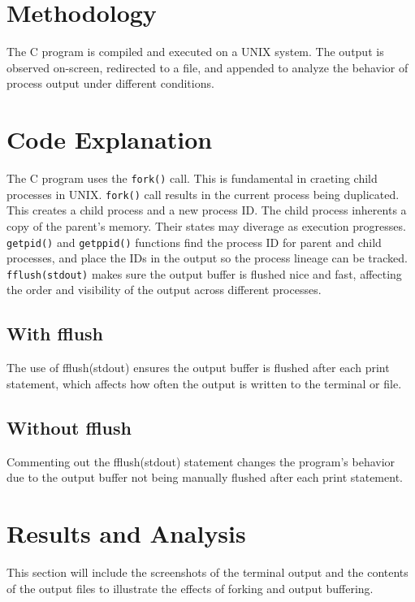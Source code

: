 \documentclass[12pt]{article}
\begin{document}
\section{Methodology}
The C program is compiled and executed on a UNIX system. The output is observed on-screen, redirected to a file, and appended to analyze the behavior of process output under different conditions.

\section{Code Explanation}
The C program uses the \texttt{fork()} call. This is fundamental in craeting child processes in UNIX. \texttt{fork()} call results in the current process being duplicated. This creates a child process and a new process ID. The child process inherents a copy of the parent's memory. Their states may diverage as execution progresses. \texttt{getpid()} and \texttt{getppid()} functions find the process ID for parent and child processes, and place the IDs in the output so the process lineage can be tracked. \texttt{fflush(stdout)} makes sure the output buffer is flushed nice and fast, affecting the order and visibility of the output across different processes.

\subsection{With fflush}
The use of fflush(stdout) ensures the output buffer is flushed after each print statement, which affects how often the output is written to the terminal or file. 



\subsection{Without fflush}
Commenting out the fflush(stdout) statement changes the program's behavior due to the output buffer not being manually flushed after each print statement.



\newpage
  \section{Results and Analysis}
This section will include the screenshots of the terminal output and the contents of the output files to illustrate the effects of forking and output buffering.
\end{document}
